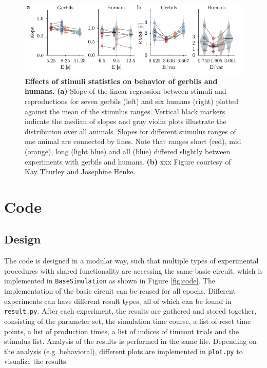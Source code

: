 \documentclass[10pt]{article}
\begin{document}
\begin{figure}[!htb]
	\centering
	\includegraphics{figures/supp_underestimationE.pdf}
	\caption{\textbf{Effects of stimuli statistics on behavior of gerbils and humans.}
	\textbf{(a)} Slope of the linear regression between stimuli and reproductions for seven gerbils (left) and six humans (right) plotted against the mean of the stimulus ranges. Vertical black markers indicate the median of slopes and gray violin plots illustrate the distribution over all animals. Slopes for different stimulus ranges of one animal are connected by lines. Note that ranges short (red), mid (orange), long (light blue) and all (blue) differed slightly between experiments with gerbils and humans.
	\textbf{(b)} xxx
	Figure courtesy of Kay Thurley and Josephine Henke.
	}
\label{sup:underestimation}
\end{figure}

\pagebreak

\section*{Code}
\subsection*{Design}
The code is designed in a modular way, such that multiple types of experimental procedures with shared functionality are accessing the same basic circuit, which is implemented in \texttt{BaseSimulation} as shown in Figure \ref{fig:code}.
The implementation of the basic circuit can be reused for all epochs.
Different experiments can have different result types, all of which can be found in \texttt{result.py}. After each experiment, the results are gathered and stored together, consisting of the parameter set, the simulation time course, a list of reset time points, a list of production times, a list of indices of timeout trials and the stimulus list.
Analysis of the results is performed in the same file. Depending on the analysis (e.g. behavioral), different plots are implemented in \texttt{plot.py} to visualize the results. 
\end{document}
